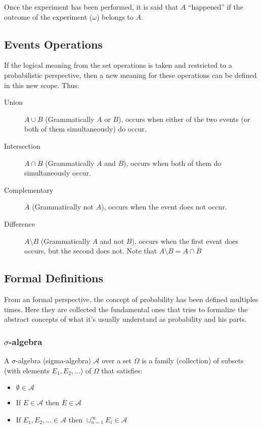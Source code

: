  Once the experiment has been performed, it is said that $A$ \enquote{happened} if the
 outcome of the experiment ($\omega$) belongs to $A$. 

\subsection{Events Operations} %
\label{sub:events_operations}

If the logical meaning from the set operations is taken and restricted to a
probabilistic perspective, then a new meaning for these operations can be
defined in this new scope. Thus:
\begin{description}
    \item[Union] $A \cup B$ (Grammatically $A$ or $B$), occurs when
    either of the two events (or both of them simultaneously) do occur.
    \item[Intersection] $A \cap B$ (Grammatically $A$ and $B$), occurs
    when both of them do simultaneously occur.
    \item[Complementary] $\overline{A}$ (Grammatically not $A$), occurs
    when the event does not occur.
    \item[Difference] $A \setminus B$ (Grammatically $A$ and not $B$),
    occurs when the first event does occurs, but the second does
    not. Note that $A \setminus B = A \cap \overline{B}$
\end{description}

\subsection{Formal Definitions} %
\label{sub:formal_definitions}

From an formal perspective, the concept of probability has been defined
multiples times. Here they are collected the fundamental ones that tries to
formalize the abstract concepts of what it's usually understand as probability
and his parts.

\subsubsection{$\sigma$-algebra} %
\label{ssub:_sigma_algebra}

A $\sigma$-algebra (sigma-algebra) $\mathcal{A}$ over a set $\Omega$ is a family
(collection) of subsets (with elements $E_1, E_2, \dots$) of $\Omega$ that
satisfies:
\begin{itemize}
    \item $\emptyset \in \mathcal{A}$
    \item If $E \in \mathcal{A}$ then $\overline{E} \in \mathcal{A}$
    \item If $E_1, E_2, \dots \in \mathcal{A}$ then $\cup_{n=1}^{\infty}E_i \in
    \mathcal{A}$ 
\end{itemize} 

